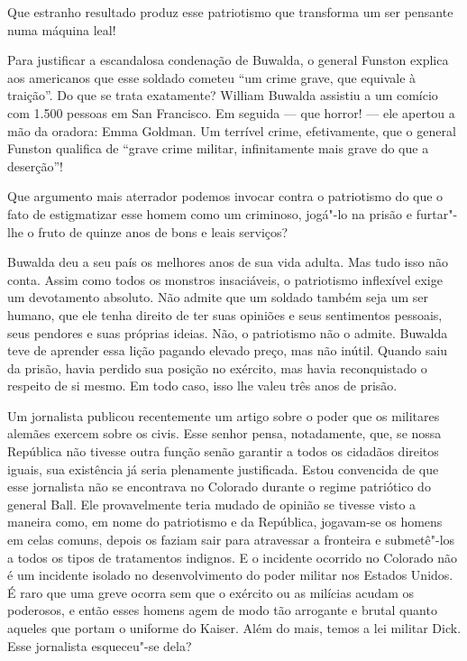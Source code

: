 Que estranho resultado produz esse patriotismo que transforma um
ser pensante numa máquina leal!

Para justificar a escandalosa condenação de Buwalda, o general Funston
explica aos americanos que esse soldado cometeu “um crime grave, que
equivale à traição”. Do que se trata exatamente? William Buwalda
assistiu a um comício com 1.500 pessoas em San Francisco. Em seguida --- que
horror! --- ele apertou a mão da oradora: Emma Goldman. Um terrível
crime, efetivamente, que o general Funston qualifica de “grave crime
militar, infinitamente mais grave do que a deserção”!

Que argumento mais aterrador podemos invocar contra o patriotismo do que
o fato de estigmatizar esse homem como um criminoso, jogá"-lo na
prisão e furtar"-lhe o fruto de quinze anos de bons e leais serviços?

Buwalda deu a seu país os melhores anos de sua vida adulta. Mas tudo
isso não conta. Assim como todos os monstros insaciáveis, o patriotismo
inflexível exige um devotamento absoluto. Não admite que um soldado
também seja um ser humano, que ele tenha direito de ter suas opiniões e
seus sentimentos pessoais, seus pendores e suas próprias ideias. Não, o
patriotismo não o admite. Buwalda teve de aprender essa lição pagando
elevado preço, mas não inútil. Quando saiu da prisão, havia perdido sua
posição no exército, mas havia reconquistado o respeito de si mesmo. Em
todo caso, isso lhe valeu três anos de prisão.

Um jornalista publicou recentemente um artigo sobre o poder que os
militares alemães exercem sobre os civis. Esse senhor pensa,
notadamente, que, se nossa República não tivesse outra função senão
garantir a todos os cidadãos direitos iguais, sua existência já seria
plenamente justificada. Estou convencida de que esse jornalista não se
encontrava no Colorado durante o regime patriótico do general Ball. Ele
provavelmente teria mudado de opinião se tivesse visto a maneira como,
em nome do patriotismo e da República, jogavam-se os homens em celas
comuns, depois os faziam sair para atravessar a fronteira e
submetê"-los a todos os tipos de tratamentos indignos. E o incidente
ocorrido no Colorado não é um incidente isolado no desenvolvimento do
poder militar nos Estados Unidos. É raro que uma greve ocorra sem que o
exército ou as milícias acudam os poderosos, e então esses homens agem
de modo tão arrogante e brutal quanto aqueles que portam o uniforme do
Kaiser. Além do mais, temos a lei militar Dick. Esse jornalista
esqueceu"-se dela?

